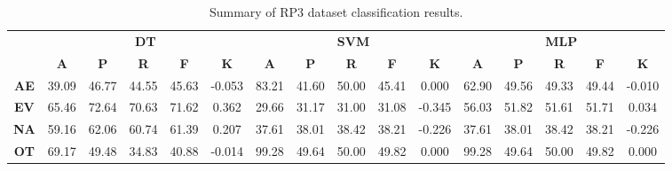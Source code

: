 \begin{landscape}
\begin{table}[htbp]
\footnotesize
\centering
\caption{Summary of RP3 dataset classification results.}
\label{tab:base_female}
\begin{tabular}{|c|c|c|c|c|c|c|c|c|c|c|c|c|c|c|c|}
\hline
\multirow{2}{*}{}	& \multicolumn{5}{c|}{\textbf{DT}}												& \multicolumn{5}{c|}{\textbf{SVM}}												& \multicolumn{5}{c|}{\textbf{MLP}}												\\ \cline{2-16} 
					& \textbf{A}	& \textbf{P}	& \textbf{R}	& \textbf{F}	& \textbf{K}	& \textbf{A}	& \textbf{P}	& \textbf{R}	& \textbf{F}	& \textbf{K}	& \textbf{A}	& \textbf{P}	& \textbf{R}	& \textbf{F}	& \textbf{K}	\\ \hline
\textbf{AE}			& 39.09			& 46.77			& 44.55			& 45.63			& -0.053			& 83.21			& 41.60			& 50.00			& 45.41			& 0.000			& 62.90			& 49.56			& 49.33			& 49.44			& -0.010			\\ \hline
\textbf{EV}			& 65.46			& 72.64			& 70.63			& 71.62			& 0.362			& 29.66			& 31.17			& 31.00			& 31.08			& -0.345			& 56.03			& 51.82			& 51.61			& 51.71			& 0.034			\\ \hline
\textbf{NA}			& 59.16			& 62.06			& 60.74			& 61.39			& 0.207			& 37.61			& 38.01			& 38.42			& 38.21			& -0.226			& 37.61			& 38.01			& 38.42			& 38.21			& -0.226			\\ \hline
\textbf{OT}			& 69.17			& 49.48			& 34.83			& 40.88			& -0.014			& 99.28			& 49.64			& 50.00			& 49.82			& 0.000			& 99.28			& 49.64			& 50.00			& 49.82			& 0.000			\\ \hline
\end{tabular}
\end{table}
\end{landscape}
